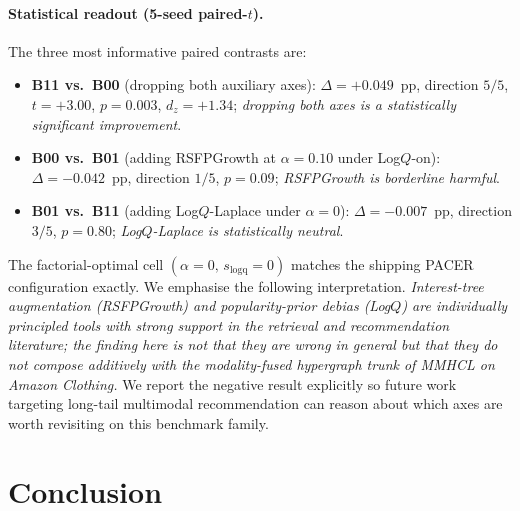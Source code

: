 \documentclass[conference]{IEEEtran}
\begin{document}
\paragraph{Statistical readout (5-seed paired-$t$).}
The three most informative paired contrasts are:
\begin{itemize}[leftmargin=1.2em,itemsep=1pt,topsep=1pt]
\item \textbf{B11 vs.\ B00} (dropping both auxiliary axes):
$\Delta{=}+0.049$~pp, direction $5/5$, $t{=}+3.00$, $p{=}0.003$,
$d_z{=}+1.34$; \emph{dropping both axes is a statistically
significant improvement}.
\item \textbf{B00 vs.\ B01} (adding RSFPGrowth at $\alpha{=}0.10$
under Log$Q$-on):
$\Delta{=}-0.042$~pp, direction $1/5$, $p{=}0.09$;
\emph{RSFPGrowth is borderline harmful}.
\item \textbf{B01 vs.\ B11} (adding Log$Q$-Laplace under
$\alpha{=}0$):
$\Delta{=}-0.007$~pp, direction $3/5$, $p{=}0.80$;
\emph{Log$Q$-Laplace is statistically neutral}.
\end{itemize}
The factorial-optimal cell $(\alpha{=}0,\, s_{\text{logq}}{=}0)$
matches the shipping PACER configuration exactly. We emphasise the
following interpretation. \emph{Interest-tree augmentation
(RSFPGrowth) and popularity-prior debias (Log$Q$) are individually
principled tools with strong support in the retrieval and
recommendation literature; the finding here is not that they are
wrong in general but that they do not compose additively with the
modality-fused hypergraph trunk of MMHCL on Amazon Clothing.} We
report the negative result explicitly so future work targeting
long-tail multimodal recommendation can reason about which axes are
worth revisiting on this benchmark family.

\section{Conclusion}
\end{document}
